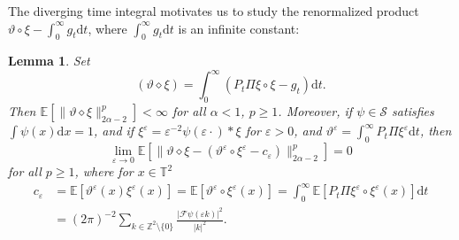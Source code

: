 \documentclass[a4paper,11pt]{article}
\newcommand{\mathd}{\mathrm{d}}
\newtheorem{lemma}[theorem]{Lemma}
\theoremstyle{remark}
\newcommand{\Z}{\mathbb{Z}}
\newcommand{\E}{\mathbb{E}}
\newcommand{\CF}{\ensuremath{\mathscr{F}}}
\newcommand{\CS}{\ensuremath{\mathscr{S}}}
\newcommand{\reso}{\,\mathord{\circ}\,}
\begin{document}
The diverging time integral motivates us to study the renormalized product $\vartheta \reso \xi  - \int_0^\infty g_t \mathd t$, where $\int_0^\infty g_t \mathd t$ is an infinite constant:

\begin{lemma}\label{l:pam area}
   Set
   \[
      (\vartheta \diamond \xi) = \int_0^\infty (P_t \Pi \xi \reso \xi - g_t) \mathd t.
   \]
   Then $\E [\| \vartheta \diamond \xi\|_{2\alpha - 2}^p]<\infty$ for all $\alpha < 1$, $p \geqslant 1$. Moreover, if $\psi \in \CS$ satisfies $\int \psi(x) \mathd x = 1$, and if $\xi^\varepsilon = \varepsilon^{-2} \psi(\varepsilon \cdot) \ast \xi$ for $\varepsilon > 0$, and $\vartheta^\varepsilon = \int_0^\infty P_t \Pi \xi^\varepsilon \mathd t$, then
   \[
      \lim_{\varepsilon \rightarrow 0} \E[ \| \vartheta \diamond \xi - ( \vartheta^\varepsilon \reso \xi^\varepsilon - c_\varepsilon) \|_{2\alpha - 2}^p] = 0
   \]
   for all $p \geqslant 1$, where for $x \in \mathbb{T}^2$
   \begin{align*}
      c_\varepsilon & = \E[\vartheta^\varepsilon(x) \xi^\varepsilon(x)] = \E[\vartheta^\varepsilon \reso \xi^\varepsilon(x)] = \int_0^\infty \E[P_t \Pi \xi^\varepsilon \reso \xi^\varepsilon(x)] \mathd t \\
      & =  (2\pi)^{-2} \sum_{k \in \Z^2 \setminus\{0\}} \frac{|\CF \psi(\varepsilon k)|^2}{|k|^2}.
   \end{align*}
\end{lemma}
\end{document}
